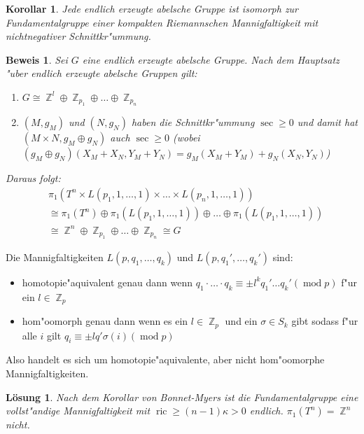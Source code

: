 \documentclass[paper=A4, twoside, chapterprefix=true, bibliography=totoc, headsepline]{scrbook}
\DeclareMathOperator{\Z}{\mathbb{Z}}
\DeclareMathOperator{\mmod}{mod}    %
\DeclareMathOperator{\ric}{ric}     %
\newcommand{\X}{\times}
\theoremstyle{plain}
\theoremstyle{nonumberplain}
\newtheorem{kor}{Korollar}
\newtheorem{bew}{Beweis}
\theoremstyle{empty}
\theoremstyle{break}
\newtheorem{Loes}{L\"osung}
\begin{document}
\begin{kor}
Jede endlich erzeugte abelsche Gruppe ist isomorph zur Fundamentalgruppe einer kompakten Riemannschen Mannigfaltigkeit mit nichtnegativer Schnittkr"ummung.
\end{kor}

\begin{bew}
Sei $G$ eine endlich erzeugte abelsche Gruppe.
Nach dem Hauptsatz "uber endlich erzeugte abelsche Gruppen gilt:
\begin{enumerate}[label=(\arabic*)]
\item
	$G \cong \Z^l \oplus \Z_{p_1} \oplus \ldots \oplus \Z_{p_n}$
\item
	$(M, g_M)$ und $(N, g_N)$ haben die Schnittkr"ummung $\sec \ge 0$ und damit hat $(M \X N, g_M \oplus g_N)$ auch $\sec \ge 0$ (wobei $(g_M \oplus g_N)(X_M + X_N, Y_M + Y_N) = g_M(X_M + Y_M) + g_N(X_N, Y_N)$)
\end{enumerate}
Daraus folgt:
\begin{align*}
	&\pi_1(T^n \X L(p_1, 1, \ldots ,1) \X \ldots \X L(p_n, 1, \ldots , 1)) \\
	&\cong \pi_1(T^n) \oplus \pi_1(L(p_1, 1, \ldots ,1)) \oplus \ldots \oplus \pi_1(L(p_1, 1, \ldots ,1)) \\
	&\cong \Z^n \oplus \Z_{p_1} \oplus \ldots \oplus \Z_{p_n} \cong G
\end{align*}
\end{bew}

Die Mannigfaltigkeiten $L(p, q_1, \ldots ,q_k)$ und $L(p, q_1', \ldots ,q_k')$ sind:\begin{itemize}
\item
	homotopie"aquivalent genau dann wenn $q_1 \cdot \ldots \cdot q_k \equiv \pm l^k q_1' \ldots q_k' (\mmod p)$ f"ur ein $l \in \Z_p$ \cite{olum}
\item
	hom"oomorph genau dann wenn es ein $l \in \Z_p$ und ein $\sigma \in S_k$ gibt sodass f"ur alle $i$ gilt $q_i \equiv \pm l q' \sigma(i) (\mmod p)$ \cite{brody1960}
\end{itemize}
Also handelt es sich um homotopie"aquivalente, aber nicht hom"oomorphe Mannigfaltigkeiten.

\begin{Loes}
Nach dem Korollar von Bonnet-Myers ist die Fundamentalgruppe eine vollst"andige Mannigfaltigkeit mit $\ric \ge (n-1) \kappa > 0$ endlich.
$\pi_1(T^n) = \Z^n$ nicht.
\end{Loes}
\end{document}
